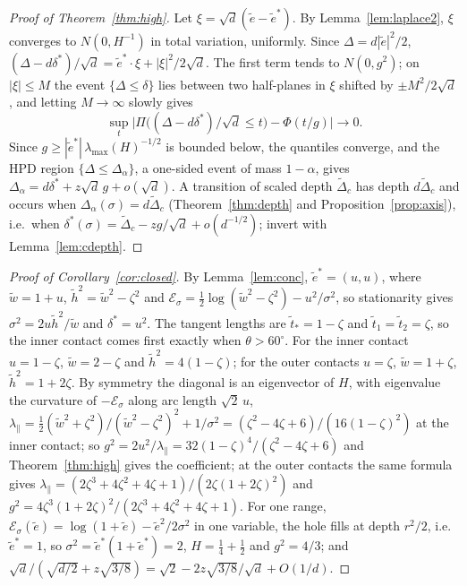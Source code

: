 \begin{proof}[Proof of Theorem~\ref{thm:high}]
Let $\xi = \sqrt d(\tilde e - \tilde e^*)$. By Lemma~\ref{lem:laplace2}, $\xi$ converges to $N(0, H^{-1})$ in total
variation, uniformly. Since $\Delta = d|\tilde e|^2/2$, $(\Delta - d\delta^*)/\sqrt d = \tilde e^*\cdot\xi + |\xi|^2/2\sqrt d$. The first
term tends to $N(0, g^2)$; on $|\xi| \le M$ the event $\{\Delta \le \delta\}$ lies between two half-planes in $\xi$ shifted by
$\pm M^2/2\sqrt d$, and letting $M \to \infty$ slowly gives
\[ \sup_t\bigl|\Pi\bigl((\Delta - d\delta^*)/\sqrt d \le t\bigr) - \Phi(t/g)\bigr| \to 0 . \]
Since $g \ge |\tilde e^*|\,\lambda_{\max}(H)^{-1/2}$ is bounded
below, the quantiles converge, and the HPD region $\{\Delta \le \Delta_\alpha\}$, a one-sided event of mass $1 - \alpha$, gives
$\Delta_\alpha = d\delta^* + z\sqrt d\,g + o(\sqrt d)$. A transition of scaled depth $\tilde\Delta_c$ has depth $d\tilde\Delta_c$ and
occurs when $\Delta_\alpha(\sigma) = d\tilde\Delta_c$ (Theorem~\ref{thm:depth} and Proposition~\ref{prop:axis}), i.e.\ when
$\delta^*(\sigma) = \tilde\Delta_c - zg/\sqrt d + o(d^{-1/2})$; invert with Lemma~\ref{lem:cdepth}.
\end{proof}

\begin{proof}[Proof of Corollary~\ref{cor:closed}]
By Lemma~\ref{lem:conc}, $\tilde e^* = (u, u)$, where $\tilde w = 1 + u$, $\tilde h^2 = \tilde w^2 - \zeta^2$ and
$\mathcal E_\sigma = \tfrac12\log(\tilde w^2 - \zeta^2) - u^2/\sigma^2$, so stationarity gives $\sigma^2 = 2u\tilde h^2/\tilde w$ and
$\delta^* = u^2$. The tangent lengths are $\tilde t_* = 1 - \zeta$ and $\tilde t_1 = \tilde t_2 = \zeta$, so the inner contact comes first
exactly when $\theta > 60^\circ$. For the inner contact $u = 1 - \zeta$, $\tilde w = 2 - \zeta$ and $\tilde h^2 = 4(1 - \zeta)$; for the
outer contacts $u = \zeta$, $\tilde w = 1 + \zeta$, $\tilde h^2 = 1 + 2\zeta$. By symmetry the diagonal is an eigenvector of $H$, with
eigenvalue the curvature of $-\mathcal E_\sigma$ along arc length $\sqrt2\,u$,
$\lambda_\parallel = \tfrac12(\tilde w^2 + \zeta^2)/(\tilde w^2 - \zeta^2)^2 + 1/\sigma^2 = (\zeta^2 - 4\zeta + 6)/(16(1-\zeta)^2)$ at the inner contact;
so $g^2 = 2u^2/\lambda_\parallel = 32(1-\zeta)^4/(\zeta^2 - 4\zeta + 6)$ and Theorem~\ref{thm:high} gives the coefficient; at the outer
contacts the same formula gives $\lambda_\parallel = (2\zeta^3 + 4\zeta^2 + 4\zeta + 1)/(2\zeta(1+2\zeta)^2)$ and
$g^2 = 4\zeta^3(1+2\zeta)^2/(2\zeta^3 + 4\zeta^2 + 4\zeta + 1)$. For one range,
$\mathcal E_\sigma(\tilde e) = \log(1 + \tilde e) - \tilde e^2/2\sigma^2$ in one variable, the hole fills at depth $r^2/2$, i.e.\
$\tilde e^* = 1$, so $\sigma^2 = \tilde e^*(1 + \tilde e^*) = 2$, $H = \tfrac14 + \tfrac12$ and $g^2 = 4/3$; and
$\sqrt d/(\sqrt{d/2} + z\sqrt{3/8}) = \sqrt2 - 2z\sqrt{3/8}/\sqrt d + O(1/d)$.
\end{proof}

